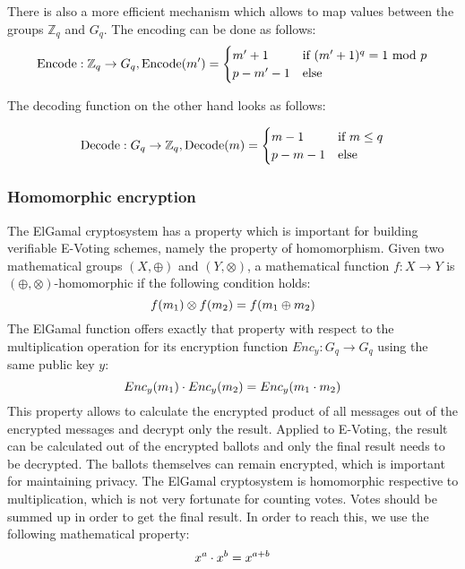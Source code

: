 \documentclass[numbers=noenddot, abstract=on]{scrreprt}
\begin{document}
There is also a more efficient mechanism which allows to
map values between the groups $\mathbb{Z}_q$ and $G_q$. The encoding can be done
as follows:
\begin{equation}
\text{Encode} : \mathbb{Z}_q \rightarrow G_q, \text{Encode}(m') = 
	\begin{cases}
	m'+1 & \text{if } (m'+1)^q = 1 \text{ mod } p \\
	p-m'-1 & \text{else}
	\end{cases} \notag
\end{equation}

The decoding function on the other hand looks as follows:

\begin{equation}
\text{Decode} : G_q \rightarrow \mathbb{Z}_q, \text{Decode}(m) = 
	\begin{cases}
	m-1 & \text{if } m \leq q \\
	p-m-1 & \text{else}
	\end{cases} \notag
\end{equation}

\subsubsection{Homomorphic encryption}
\label{sec:homenc}
The ElGamal cryptosystem has a property
which is important for building verifiable E-Voting schemes, namely the property
of homomorphism. Given two mathematical groups $(X,\oplus)$ and $(Y,\otimes)$, a
mathematical function $f:X \rightarrow Y$ is $(\oplus, \otimes)$-homomorphic if
the following condition holds:
\begin{equation}
f(m_1) \otimes f(m_2) = f(m_1 \oplus m_2) \notag
\end{equation}
The ElGamal function offers exactly that property with respect to the
multiplication operation for its encryption function $Enc_y:G_q \rightarrow
G_q$ using the same public key $y$:
\begin{equation}
Enc_y(m_1) \cdot Enc_y(m_2) = Enc_y(m_1 \cdot m_2) \notag
\end{equation}
This property allows to calculate the encrypted product of all messages out of
the encrypted messages and decrypt only the result. Applied to E-Voting, the
result can be calculated out of the encrypted ballots and only the final result
needs to be decrypted. The ballots themselves can remain encrypted, which is
important for maintaining privacy. The ElGamal cryptosystem is homomorphic
respective to multiplication, which is not very fortunate for counting votes.
Votes should be summed up in order to get the final result. In order to reach
this, we use the following mathematical property:
\begin{equation}
x^a \cdot x^b = x^{a+b} \notag
\end{equation}
\end{document}
